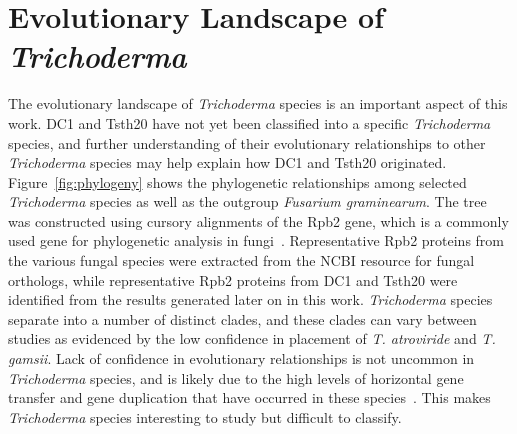 \section{Evolutionary Landscape of \textit{Trichoderma}}
\label{lit:evolution}

The evolutionary landscape of \textit{Trichoderma} species is an important aspect of this work. DC1 and Tsth20 have not yet been classified into a specific \textit{Trichoderma} species, and further understanding of their evolutionary relationships to other \textit{Trichoderma} species may help explain how DC1 and Tsth20 originated. 
Figure~\ref{fig:phylogeny} shows the phylogenetic relationships among selected \textit{Trichoderma} species as well as the outgroup \textit{Fusarium graminearum}. The tree was constructed using cursory alignments of the Rpb2 gene, which is a commonly used gene for phylogenetic analysis in fungi~\cite{an2022}. Representative Rpb2 proteins from the various fungal species were extracted from the NCBI resource for fungal orthologs, while representative Rpb2 proteins from DC1 and Tsth20 were identified from the results generated later on in this work. \textit{Trichoderma} species separate into a number of distinct clades, and these clades can vary between studies as evidenced by the low confidence in placement of \textit{T. atroviride} and \textit{T. gamsii}. Lack of confidence in evolutionary relationships is not uncommon in \textit{Trichoderma} species, and is likely due to the high levels of horizontal gene transfer and gene duplication that have occurred in these species~\cite{goncalves2024}. This makes \textit{Trichoderma} species interesting to study but difficult to classify. 

